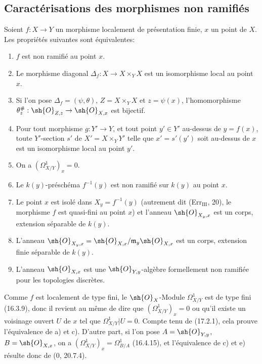 
\subsection{Caractérisations des morphismes non ramifiés}

\begin{theorem}[17.4.1]
\label{IV.17.4.1}
Soient $f:X\to Y$ un morphisme localement de présentation finie, $x$ un point de $X$. Les propriétés suivantes sont équivalentes:
\begin{enumerate}
  \item[a)] $f$ est non ramifié au point $x$.
  \item[b)] Le morphisme diagonal $\Delta_f:X\to X\times_Y X$ est un isomorphisme local au point $x$.
  \item[b')] Si l'on pose $\Delta_f=(\psi,\theta)$, $Z=X\times_Y X$ et $z=\psi(x)$, l'homomorphisme $\theta_z^\#:\sh{O}_{Z,z}\to\sh{O}_{X,x}$ est bijectif.
  \item[b'')] Pour tout morphisme $g:Y'\to Y$, et tout point $y'\in Y'$ au-dessus de $y=f(x)$, toute $Y'$-section $s'$ de $X'=X\times_Y Y'$ telle que $x'=s'(y')$ soit au-dessus de $x$ est un isomorphisme local au point $y'$.
  \item[c)] On a $(\Omega^1_{X/Y})_x=0$.
  \item[d)] Le $k(y)$-préschéma $f^{-1}(y)$ est non ramifié sur $k(y)$ au point $x$.
  \item[d')] Le point $x$ est isolé dans $X_y=f^{-1}(y)$ (autrement dit (Err$_{\mathrm{III}}$, 20), le morphisme $f$ est quasi-fini au point $x$) et l'anneau $\sh{O}_{X_y,x}$ est un corps, extension séparable de $k(y)$.
  \item[d'')] L'anneau $\sh{O}_{X_y,x}=\sh{O}_{X,x}/\mathfrak{m}_y\sh{O}_{X,x}$ est un corps, extension finie séparable de $k(y)$.
  \item[e)] L'anneau $\sh{O}_{X,x}$ est une $\sh{O}_{Y,y}$-algèbre formellement non ramifiée pour les topologies discrètes.
\end{enumerate}
\end{theorem}

Comme $f$ est localement de type fini, le $\sh{O}_X$-Module $\Omega^1_{X/Y}$ est de type fini (16.3.9), donc il revient au même de dire que $(\Omega^1_{X/Y})_x=0$ ou qu'il existe un voisinage ouvert $U$ de $x$ tel que $\Omega^1_{X/Y}|U=0$. Compte tenu de (17.2.1), cela prouve l'équivalence de a) et c). D'autre part, si l'on pose $A=\sh{O}_{Y,y}$, $B=\sh{O}_{X,x}$, on a $(\Omega^1_{X/Y})_x=\Omega^1_{B/A}$ (16.4.15), et l'équivalence de c) et e) résulte donc de (0, 20.7.4).

